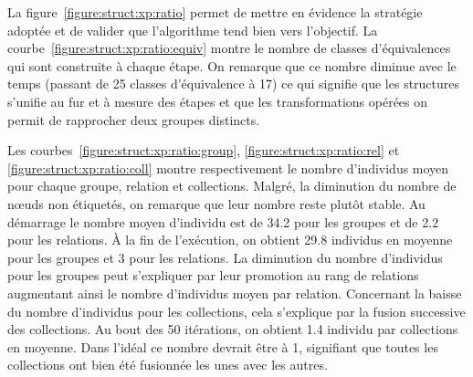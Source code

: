 La figure~\ref{figure:struct:xp:ratio} permet de mettre en évidence la stratégie adoptée et de valider que l'algorithme tend bien vers l'objectif.
La courbe~\ref{figure:struct:xp:ratio:equiv} montre le nombre de classes d'équivalences qui sont construite à chaque étape. %
On remarque que ce nombre diminue avec le temps (passant de \num{25} classes d'équivalence à \num{17}) ce qui signifie que les structures s'unifie au fur et à mesure des étapes et que les transformations opérées on permit de rapprocher deux groupes distincts.

Les courbes~\ref{figure:struct:xp:ratio:group}, \ref{figure:struct:xp:ratio:rel} et \ref{figure:struct:xp:ratio:coll} montre respectivement le nombre d'individus moyen pour chaque groupe, relation et collections. %
Malgré, la diminution du nombre de nœuds non étiquetés, on remarque que leur nombre reste plutôt stable.
Au démarrage le nombre moyen d'individu est de \num{34.2} pour les groupes et de \num{2.2} pour les relations.
À la fin de l'exécution, on obtient \num{29.8} individus en moyenne pour les groupes et \num{3} pour les relations.
La diminution du nombre d'individus pour les groupes peut s'expliquer par leur promotion au rang de relations augmentant ainsi le nombre d'individus moyen par relation.
Concernant la baisse du nombre d'individus pour les collections, cela s'explique par la fusion successive des collections.
Au bout des \num{50} itérations, on obtient \num{1.4} individu par collections en moyenne.
Dans l'idéal ce nombre devrait être à \num{1}, signifiant que toutes les collections ont bien été fusionnée les unes avec les autres.


